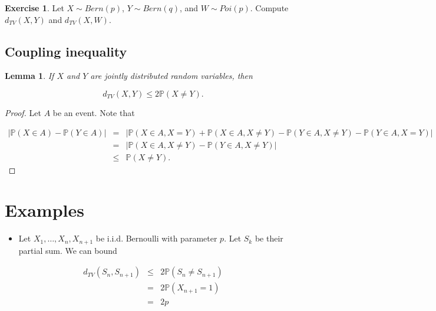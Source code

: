\documentclass[
]{article}
\providecommand{\tightlist}{%
  \setlength{\itemsep}{0pt}\setlength{\parskip}{0pt}}
\newtheorem{lemma}{Lemma}[section]
\theoremstyle{definition}
\theoremstyle{definition}
\theoremstyle{definition}
\newtheorem{exercise}{Exercise}[section]
\theoremstyle{definition}
\theoremstyle{remark}
\begin{document}
\begin{exercise}
\protect\hypertarget{exr:unnamed-chunk-7}{}\label{exr:unnamed-chunk-7}Let \(X \sim Bern(p)\), \(Y \sim Bern(q)\), and \(W \sim Poi(p)\). Compute
\(d_{TV}(X,Y)\) and \(d_{TV}(X, W).\)
\end{exercise}

\hypertarget{coupling-inequality}{%
\subsection{Coupling inequality}\label{coupling-inequality}}

\begin{lemma}
\protect\hypertarget{lem:unnamed-chunk-8}{}\label{lem:unnamed-chunk-8}If \(X\) and \(Y\) are jointly distributed random variables, then

\[d_{TV}(X,Y) \leq 2\mathbb{P}(X \not = Y).\]
\end{lemma}

\begin{proof}
Let \(A\) be an event. Note that

\begin{eqnarray*}
        |\mathbb{P}(X \in A) - \mathbb{P}(Y \in A)|
    &=& \Big| \mathbb{P}(X \in A, X = Y) +  \mathbb{P}(X \in A, X\not = Y) -   \mathbb{P}(Y \in A, X\not = Y)- \mathbb{P}(Y \in A, X = Y) \Big| \\
        &=&   |\mathbb{P}(X \in A, X \not = Y) -  \mathbb{P}(Y \in A, X\not = Y) | \\
        &\leq&
        \mathbb{P}(X \not = Y).
    \end{eqnarray*}
\end{proof}

\hypertarget{examples-1}{%
\section{Examples}\label{examples-1}}

\begin{itemize}
\tightlist
\item
  Let \(X_1, \ldots, X_n, X_{n+1}\) be i.i.d. Bernoulli with parameter \(p\). Let \(S_k\) be their partial sum. We can bound
\end{itemize}

\begin{eqnarray*}
d_{TV}(S_n, S_{n+1}) &\leq& 2\mathbb{P}(S_n \not = S_{n+1}) \\
&=&  2\mathbb{P}(X_{n+1} = 1) \\
&=&  2p
\end{eqnarray*}
\end{document}
